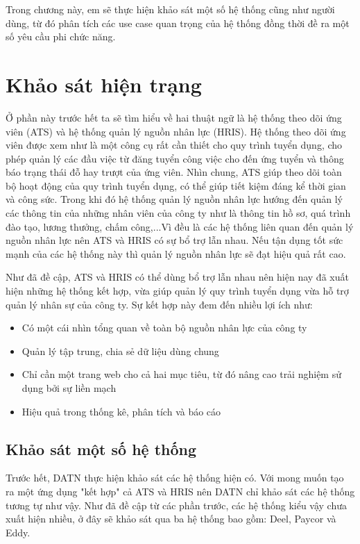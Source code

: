 \documentclass[../DoAn.tex]{subfiles}
\begin{document}
\raggedbottom
Trong chương này, em sẽ thực hiện khảo sát một số hệ thống cũng như người dùng, từ đó phân tích các use case quan trọng của hệ thống đồng thời đề ra một số yêu cầu phi chức năng.
\section{Khảo sát hiện trạng}
\label{section:2.1}
Ở phần này trước hết ta sẽ tìm hiểu về hai thuật ngữ là hệ thống theo dõi ứng viên (ATS) và hệ thống quản lý nguồn nhân lực (HRIS). Hệ thống theo dõi ứng viên được xem như là một công cụ rất cần thiết cho quy trình tuyển dụng, cho phép quản lý các đầu việc từ đăng tuyển công việc cho đến ứng tuyển và thông báo trạng thái đỗ hay trượt của ứng viên. Nhìn chung, ATS giúp theo dõi toàn bộ hoạt động của quy trình tuyển dụng, có thể giúp tiết kiệm đáng kể thời gian và công sức. Trong khi đó hệ thống quản lý nguồn nhân lực hướng đến quản lý các thông tin của những nhân viên của công ty như là thông tin hồ sơ, quá trình đào tạo, lương thưởng, chấm công,...Vì đều là các hệ thống liên quan đến quản lý nguồn nhân lực nên ATS và HRIS có sự bổ trợ lẫn nhau. Nếu tận dụng tốt sức mạnh của các hệ thống này thì quản lý nguồn nhân lực sẽ đạt hiệu quả rất cao.

Như đã đề cập, ATS và HRIS có thể dùng bổ trợ lẫn nhau nên hiện nay đã xuất hiện những hệ thống kết hợp, vừa giúp quản lý quy trình tuyển dụng vừa hỗ trợ quản lý nhân sự của công ty. Sự kết hợp này đem đến nhiều lợi ích như:
\begin{itemize}
\item Có một cái nhìn tổng quan về toàn bộ nguồn nhân lực của công ty
\item Quản lý tập trung, chia sẻ dữ liệu dùng chung
\item Chỉ cần một trang web cho cả hai mục tiêu, từ đó nâng cao trải nghiệm sử dụng bởi sự liền mạch
\item Hiệu quả trong thống kê, phân tích và báo cáo
\end{itemize}

\subsection{Khảo sát một số hệ thống}
Trước hết, DATN thực hiện khảo sát các hệ thống hiện có. Với mong muốn tạo ra một ứng dụng "kết hợp" cả ATS và HRIS nên DATN chỉ khảo sát các hệ thống tương tự như vậy. Như đã đề cập từ các phần trước, các hệ thống kiểu vậy chưa xuất hiện nhiều, ở đây sẽ khảo sát qua ba hệ thống bao gồm: Deel, Paycor và Eddy.
\end{document}
